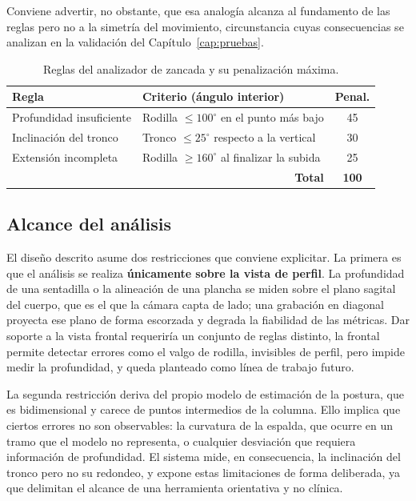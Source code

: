 \documentclass[12pt,a4paper,twoside,openright]{book}
\begin{document}
    Conviene advertir, no obstante, que esa analogía alcanza al fundamento de las
    reglas pero no a la simetría del movimiento, circunstancia cuyas
    consecuencias se analizan en la validación del
    Capítulo~\ref{cap:pruebas}.

    \begin{table}[htbp]
        \centering
        \small
        \begin{tabular}{p{4.6cm} p{5.2cm} c}
            \toprule
            \textbf{Regla} & \textbf{Criterio (ángulo interior)} & \textbf{Penal.} \\
            \midrule
            Profundidad insuficiente & Rodilla $\le 100^\circ$ en el punto más bajo & 45 \\
            Inclinación del tronco   & Tronco $\le 25^\circ$ respecto a la vertical  & 30 \\
            Extensión incompleta     & Rodilla $\ge 160^\circ$ al finalizar la subida & 25 \\
            \midrule
            \multicolumn{2}{r}{\textbf{Total}} & \textbf{100} \\
            \bottomrule
        \end{tabular}
        \caption{Reglas del analizador de zancada y su penalización máxima.}
        \label{tab:reglas-zancada}
    \end{table}

    \subsection{Alcance del análisis}

    El diseño descrito asume dos restricciones que conviene explicitar. La
    primera es que el análisis se realiza \textbf{únicamente sobre la vista de
    perfil}. La profundidad de una sentadilla o la alineación de una plancha se
    miden sobre el plano sagital del cuerpo, que es el que la cámara capta de
    lado; una grabación en diagonal proyecta ese plano de forma escorzada y
    degrada la fiabilidad de las métricas. Dar soporte a la vista frontal
    requeriría un conjunto de reglas distinto, la frontal permite detectar
    errores como el valgo de rodilla, invisibles de perfil, pero impide medir la
    profundidad, y queda planteado como línea de trabajo futuro.

    La segunda restricción deriva del propio modelo de estimación de la postura, que es
    bidimensional y carece de puntos intermedios de la columna. Ello implica que
    ciertos errores no son observables: la curvatura de la espalda, que ocurre en
    un tramo que el modelo no representa, o cualquier desviación que requiera
    información de profundidad. El sistema mide, en consecuencia, la inclinación
    del tronco pero no su redondeo, y expone estas limitaciones de forma
    deliberada, ya que delimitan el alcance de una herramienta orientativa y no
    clínica.
\end{document}
